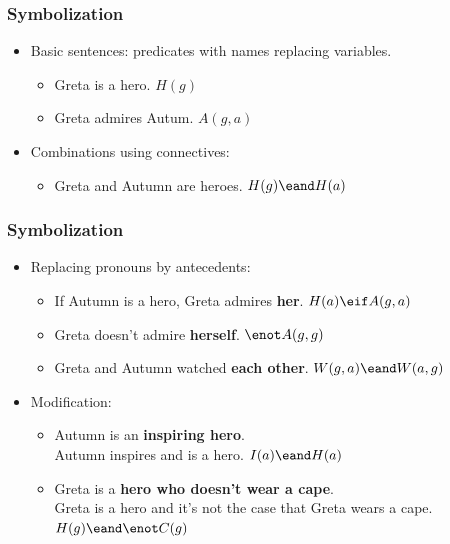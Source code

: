\begin{frame}
\frametitle{Symbolization}

\begin{itemize}[<+->]
\item Basic sentences: predicates with names replacing variables.
\begin{itemize}[<+->]
  \item Greta is a hero. \alert{$H(g)$}
  \item Greta admires Autum. \alert{$A(g,a)$}
\end{itemize}
\item Combinations using connectives:
\begin{itemize}[<+->]
  \item Greta and Autumn are heroes. \alert{$H(g) \eand H(a)$}
\end{itemize}
  \end{itemize}
\end{frame}

\begin{frame}
\frametitle{Symbolization}

\begin{itemize}[<+->]
\item Replacing pronouns by antecedents:
\begin{itemize}[<+->]
  \item If Autumn is a hero, Greta admires \textbf{her}. \alert{$H(a) \eif A(g, a)$}
  \item Greta doesn't admire \textbf{herself}. \alert{$\enot A(g,g)$}
  \item Greta and Autumn watched \textbf{each other}. \alert{$W(g, a) \eand W(a, g)$}
\end{itemize}
\item Modification:
\begin{itemize}[<+->]
  \item Autumn is an \textbf{inspiring hero}.\\
  Autumn inspires and is a hero. \alert{$I(a) \eand H(a)$}
  \item Greta is a \textbf{hero who doesn't wear a cape}.\\
   Greta is a hero and it's not the case that Greta wears a cape.
   \alert{$H(g) \eand \enot C(g)$}
\end{itemize}
\end{itemize}
\end{frame}

